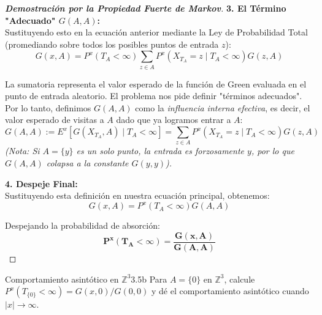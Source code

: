 \documentclass[10pt,a4paper]{article}
\begin{document}
\begin{proof}[\textbf{Demostración por la Propiedad Fuerte de Markov}]
    \textbf{3. El Término "Adecuado" $G(A,A)$:} \\
    Sustituyendo esto en la ecuación anterior mediante la Ley de Probabilidad Total (promediando sobre todos los posibles puntos de entrada $z$):
    \[ G(x, A) = P^x(T_A < \infty) \sum_{z \in A} P^x(X_{T_A} = z \mid T_A < \infty) G(z, A) \]
    
    La sumatoria representa el valor esperado de la función de Green evaluada en el punto de entrada aleatorio. El problema nos pide definir "términos adecuados". Por lo tanto, definimos $G(A,A)$ como la \textit{influencia interna efectiva}, es decir, el valor esperado de visitas a $A$ dado que ya logramos entrar a $A$:
    \[ G(A, A) := E^x \left[ G(X_{T_A}, A) \mid T_A < \infty \right] = \sum_{z \in A} P^x(X_{T_A} = z \mid T_A < \infty) G(z, A) \]
    \textit{(Nota: Si $A=\{y\}$ es un solo punto, la entrada es forzosamente $y$, por lo que $G(A,A)$ colapsa a la constante $G(y,y)$).}
    
    \textbf{4. Despeje Final:} \\
    Sustituyendo esta definición en nuestra ecuación principal, obtenemos:
    \[ G(x, A) = P^x(T_A < \infty) G(A, A) \]
    
    Despejando la probabilidad de absorción:
    \[ \mathbf{P^x(T_A < \infty) = \frac{G(x, A)}{G(A, A)}} \]
    
    
\end{proof}

\newpage

\vspace{5mm}

\begin{ejercicio}{Comportamiento asintótico en $\mathbb{Z}^3$}{3.5b}
    Para $A = \{0\}$ en $\mathbb{Z}^3$, calcule $P^x(T_{\{0\}} < \infty) = G(x,0)/G(0,0)$ y dé el comportamiento asintótico cuando $|x| \to \infty$.
\end{ejercicio}
\end{document}
